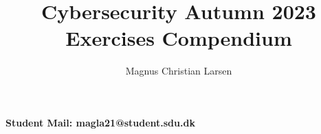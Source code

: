 \documentclass{article}
\title{%
    \bf{Cybersecurity Autumn 2023} \\
    \large Exercises Compendium
}
\author{Magnus Christian Larsen}
\begin{document}
\lstset{
    numbers=left,
    frame=line,
    breaklines=true
}


\maketitle
\vspace*{\fill}
\begin{center}
    \bf{%
        Student Mail: magla21@student.sdu.dk}
\end{center}
\newpage
\tableofcontents
\newpage








\end{document}
